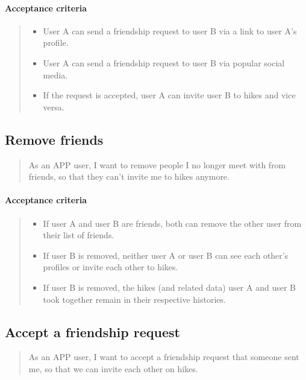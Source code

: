 \paragraph*{Acceptance criteria}
\begin{quote}
\begin{itemize}
    \item User A can send a friendship request to user B via a link to user A's profile.
    \item User A can send a friendship request to user B via popular social media.
    \item If the request is accepted, user A can invite user B to hikes and vice versa.
\end{itemize}
\end{quote}

\subsection{Remove friends}\label{US:friends-remove}
\begin{quote}
As an APP user, I want to remove people I no longer meet with from friends, so that they can't invite me to hikes anymore.
\end{quote}

\paragraph*{Acceptance criteria}
\begin{quote}
\begin{itemize}
    \item If user A and user B are friends, both can remove the other user from their list of friends.
    \item If user B is removed, neither user A or user B can see each other's profiles or invite each other to hikes.
    \item If user B is removed, the hikes (and related data) user A and user B took together remain in their respective histories.
\end{itemize}
\end{quote}

\subsection{Accept a friendship request}\label{US:friends-accept}
\begin{quote}
As an APP user, I want to accept a friendship request that someone sent me, so that we can invite each other on hikes.
\end{quote}

